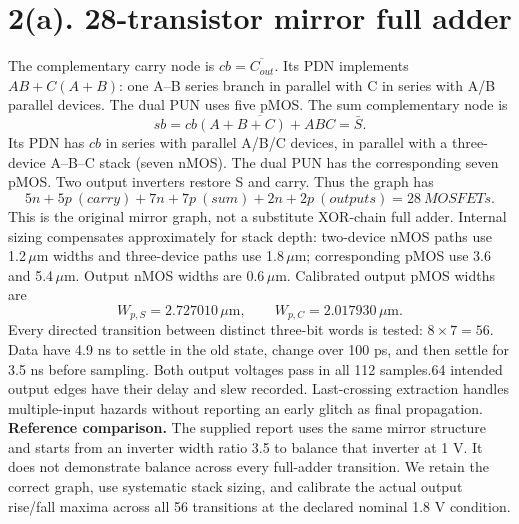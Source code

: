 \documentclass[11pt,a4paper]{article}
\begin{document}
\section*{2(a). 28-transistor mirror full adder}
The complementary carry node is $cb=\overline{C_{out}}$. Its PDN implements
$AB+C(A+B)$: one A--B series branch in parallel with C in series with A/B parallel devices. The dual PUN uses five pMOS. The sum complementary node is
\[
 sb=\overline{cb(A+B+C)+ABC}=\bar S.
\]
Its PDN has $cb$ in series with parallel A/B/C devices, in parallel with a three-device A--B--C stack (seven nMOS). The dual PUN has the corresponding seven pMOS. Two output inverters restore S and carry. Thus the graph has
\[
 5n+5p\ (carry)+7n+7p\ (sum)+2n+2p\ (outputs)=28\ MOSFETs.
\]
This is the original mirror graph, not a substitute XOR-chain full adder. Internal sizing compensates approximately for stack depth: two-device nMOS paths use 1.2$\,\mu$m widths and three-device paths use 1.8$\,\mu$m; corresponding pMOS use 3.6 and 5.4$\,\mu$m. Output nMOS widths are 0.6$\,\mu$m. Calibrated output pMOS widths are
\[
 W_{p,S}=2.727010\,\mu\mathrm m,\qquad
 W_{p,C}=2.017930\,\mu\mathrm m.
\]
Every directed transition between distinct three-bit words is tested: $8\times 7=56$. Data have 4.9 ns to settle in the old state, change over 100 ps, and then settle for 3.5 ns before sampling. Both output voltages pass in all 112 samples.64 intended output edges have their delay and slew recorded. Last-crossing extraction handles multiple-input hazards without reporting an early glitch as final propagation.
\textbf{Reference comparison.} The supplied report uses the same mirror structure and starts from an inverter width ratio 3.5 to balance that inverter at 1 V. It does not demonstrate balance across every full-adder transition. We retain the correct graph, use systematic stack sizing, and calibrate the actual output rise/fall maxima across all 56 transitions at the declared nominal 1.8 V condition.
\end{document}
